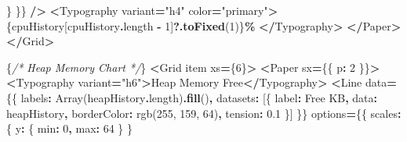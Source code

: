 \documentclass[
]{article}
\newenvironment{Shaded}{\begin{snugshade}}{\end{snugshade}}
\newcommand{\AttributeTok}[1]{\textcolor[rgb]{0.13,0.29,0.53}{#1}}
\newcommand{\BuiltInTok}[1]{#1}
\newcommand{\CommentTok}[1]{\textcolor[rgb]{0.56,0.35,0.01}{\textit{#1}}}
\newcommand{\DecValTok}[1]{\textcolor[rgb]{0.00,0.00,0.81}{#1}}
\newcommand{\FloatTok}[1]{\textcolor[rgb]{0.00,0.00,0.81}{#1}}
\newcommand{\FunctionTok}[1]{\textcolor[rgb]{0.13,0.29,0.53}{\textbf{#1}}}
\newcommand{\NormalTok}[1]{#1}
\newcommand{\OperatorTok}[1]{\textcolor[rgb]{0.81,0.36,0.00}{\textbf{#1}}}
\newcommand{\StringTok}[1]{\textcolor[rgb]{0.31,0.60,0.02}{#1}}
\begin{document}
\begin{Shaded}
\begin{Highlighting}[]
\NormalTok{              \}}
\NormalTok{            \}\}}
          \OperatorTok{/\textgreater{}}
          \OperatorTok{\textless{}}\NormalTok{Typography variant}\OperatorTok{=}\StringTok{"h4"}\NormalTok{ color}\OperatorTok{=}\StringTok{"primary"}\OperatorTok{\textgreater{}}
\NormalTok{            \{cpuHistory[cpuHistory}\OperatorTok{.}\AttributeTok{length} \OperatorTok{{-}} \DecValTok{1}\NormalTok{]}\OperatorTok{?.}\FunctionTok{toFixed}\NormalTok{(}\DecValTok{1}\NormalTok{)\}}\OperatorTok{\%}
          \OperatorTok{\textless{}/}\NormalTok{Typography}\OperatorTok{\textgreater{}}
        \OperatorTok{\textless{}/}\NormalTok{Paper}\OperatorTok{\textgreater{}}
      \OperatorTok{\textless{}/}\NormalTok{Grid}\OperatorTok{\textgreater{}}

\NormalTok{      \{}\CommentTok{/* Heap Memory Chart */}\NormalTok{\}}
      \OperatorTok{\textless{}}\NormalTok{Grid item xs}\OperatorTok{=}\NormalTok{\{}\DecValTok{6}\NormalTok{\}}\OperatorTok{\textgreater{}}
        \OperatorTok{\textless{}}\NormalTok{Paper sx}\OperatorTok{=}\NormalTok{\{\{ p}\OperatorTok{:} \DecValTok{2}\NormalTok{ \}\}}\OperatorTok{\textgreater{}}
          \OperatorTok{\textless{}}\NormalTok{Typography variant}\OperatorTok{=}\StringTok{"h6"}\OperatorTok{\textgreater{}}\NormalTok{Heap Memory Free}\OperatorTok{\textless{}/}\NormalTok{Typography}\OperatorTok{\textgreater{}}
          \OperatorTok{\textless{}}\NormalTok{Line}
\NormalTok{            data}\OperatorTok{=}\NormalTok{\{\{}
\NormalTok{              labels}\OperatorTok{:} \BuiltInTok{Array}\NormalTok{(heapHistory}\OperatorTok{.}\AttributeTok{length}\NormalTok{)}\OperatorTok{.}\FunctionTok{fill}\NormalTok{(}\StringTok{\textquotesingle{}\textquotesingle{}}\NormalTok{)}\OperatorTok{,}
\NormalTok{              datasets}\OperatorTok{:}\NormalTok{ [\{}
\NormalTok{                label}\OperatorTok{:} \StringTok{\textquotesingle{}Free KB\textquotesingle{}}\OperatorTok{,}
\NormalTok{                data}\OperatorTok{:}\NormalTok{ heapHistory}\OperatorTok{,}
\NormalTok{                borderColor}\OperatorTok{:} \StringTok{\textquotesingle{}rgb(255, 159, 64)\textquotesingle{}}\OperatorTok{,}
\NormalTok{                tension}\OperatorTok{:} \FloatTok{0.1}
\NormalTok{              \}]}
\NormalTok{            \}\}}
\NormalTok{            options}\OperatorTok{=}\NormalTok{\{\{}
\NormalTok{              scales}\OperatorTok{:}\NormalTok{ \{}
\NormalTok{                y}\OperatorTok{:}\NormalTok{ \{ min}\OperatorTok{:} \DecValTok{0}\OperatorTok{,}\NormalTok{ max}\OperatorTok{:} \DecValTok{64}\NormalTok{ \}}
\NormalTok{              \}}

\end{Highlighting}
\end{Shaded}
\end{document}
